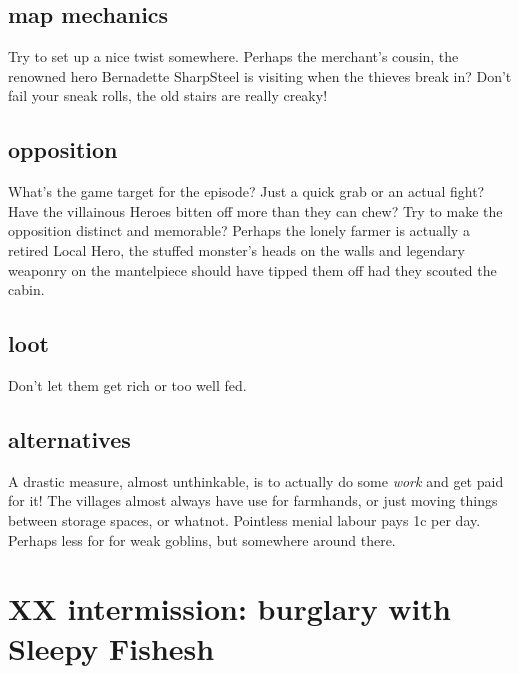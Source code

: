\subsection*{map mechanics}

Try to set up a nice twist somewhere. Perhaps the merchant's cousin, the renowned hero Bernadette SharpSteel is visiting when the thieves break in? Don't fail your sneak rolls, the old stairs are really creaky!


\subsection*{opposition}

What's the game target for the episode? Just a quick grab or an actual fight? Have the villainous Heroes bitten off more than they can chew? Try to make the opposition distinct and memorable? Perhaps the lonely farmer is actually a retired Local Hero, the stuffed monster's heads on the walls and legendary weaponry on the mantelpiece should have tipped them off had they scouted the cabin.


\subsection*{loot}

Don't let them get rich or too well fed.


\subsection*{alternatives}
A drastic measure, almost unthinkable, is to actually do some \emph{work} and get paid for it! The villages almost always have use for farmhands, or just moving things between storage spaces, or whatnot. Pointless menial labour pays 1c per day. Perhaps less for for weak goblins, but somewhere around there.









\clearpage
\section*{XX intermission: burglary with Sleepy Fishesh}

